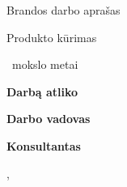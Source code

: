 \thispagestyle{empty}
\begin{center}
\MakeUppercase{\Mokykla}\par
\vspace{1.3cm}
\Dalykas\par
\Klase\par
\vspace{2.2cm}
{\fontsize{14}{17}\selectfont\bfseries\TemaLT\par}
\vspace{0.4cm}
{\itshape\TemaEN\par}
\vspace{1cm}
Brandos darbo aprašas\par
Produkto kūrimas\par
\MoksloMetai\ mokslo metai\par
\end{center}
\vfill
\begin{flushright}
\begin{minipage}{0.64\textwidth}
\raggedright
\textbf{Darbą atliko}\par
\Autorius\par
\medskip
\textbf{Darbo vadovas}\par
\Vadovas\par
\VadovoKvalifikacija\par
\ifKonsultantas
\medskip\textbf{Konsultantas}\par\Konsultantas\par
\fi
\end{minipage}
\end{flushright}
\vfill
\begin{center}\Miestas, \PateikimoMetai\end{center}
\clearpage
